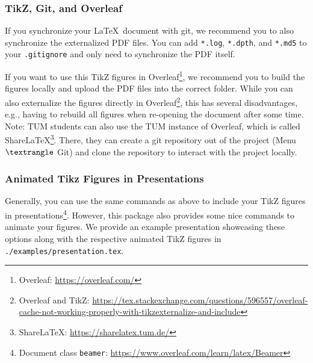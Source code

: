 \documentclass{article}
\begin{document}
\subsubsection{TikZ, Git, and Overleaf}
If you synchronize your \LaTeX\ document with git,
we recommend you to also synchronize the externalized PDF files.
You can add \texttt{*.log}, \texttt{*.dpth}, and \texttt{*.md5} to your \texttt{.gitignore} and only need to synchronize the PDF itself.

If you want to use this TikZ figures in Overleaf\footnote{Overleaf: \url{https://overleaf.com/}},
we recommend you to build the figures locally and upload the PDF files into the correct folder.
While you can also externalize the figures directly in Overleaf\footnote{Overleaf and TikZ: \url{https://tex.stackexchange.com/questions/596557/overleaf-cache-not-working-properly-with-tikzexternalize-and-include}},
this has several disadvantages, e.g., having to rebuild all figures when re-opening the document after some time.
Note: TUM students can also use the TUM instance of Overleaf, which is called ShareLaTeX\footnote{ShareLaTeX: \url{https://sharelatex.tum.de/}}.
There, they can create a git repository out of the project (Menu $\textrangle$ Git) and clone the repository to interact with the project locally.

\subsubsection{Animated Tikz Figures in Presentations}
Generally, you can use the same commands as above to include your TikZ figures in presentations\footnote{Document class \texttt{beamer}: \url{https://www.overleaf.com/learn/latex/Beamer}}.
However, this package also provides some nice commands to animate your figures.
We provide an example presentation showcasing these options along with the respective animated TikZ figures in \texttt{./examples/presentation.tex}.
\end{document}
